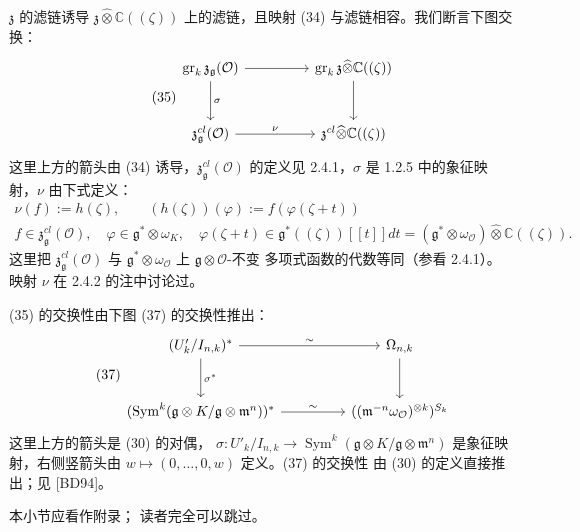 $\mathfrak{z}$ 的滤链诱导 $\mathfrak{z}\widehat{\otimes}\mathbb{C}((\zeta))$
上的滤链，且映射 (34) 与滤链相容。我们断言下图交换：
\begin{equation}\tag{35}
\begin{tikzcd}[column sep=4.6em, row sep=2.8em]
\operatorname{gr}_k\mathfrak{z}_{\mathfrak{g}}(\mathcal{O}) \arrow[r] \arrow[d, "\sigma"]
  & \operatorname{gr}_k\mathfrak{z}\widehat{\otimes}\mathbb{C}((\zeta)) \arrow[d] \\
\mathfrak{z}^{cl}_{\mathfrak{g}}(\mathcal{O}) \arrow[r, "\nu"]
  & \mathfrak{z}^{cl}\widehat{\otimes}\mathbb{C}((\zeta))
\end{tikzcd}
\end{equation}
这里上方的箭头由 (34) 诱导，$\mathfrak{z}^{cl}_{\mathfrak{g}}(\mathcal{O})$
的定义见 2.4.1，$\sigma$ 是 1.2.5 中的象征映射，$\nu$ 由下式定义：
\begin{equation}\tag{36}
\begin{gathered}
\nu(f):=h(\zeta),\qquad (h(\zeta))(\varphi):=f(\varphi(\zeta+t))\\
f\in\mathfrak{z}^{cl}_{\mathfrak{g}}(\mathcal{O}),\quad
\varphi\in\mathfrak{g}^*\otimes\omega_K,\quad
\varphi(\zeta+t)\in\mathfrak{g}^*((\zeta))[[t]]dt
=(\mathfrak{g}^*\otimes\omega_{\mathcal{O}})\widehat{\otimes}\mathbb{C}((\zeta)).
\end{gathered}
\end{equation}
这里把 $\mathfrak{z}^{cl}_{\mathfrak{g}}(\mathcal{O})$ 与
$\mathfrak{g}^*\otimes\omega_{\mathcal{O}}$ 上 $\mathfrak{g}\otimes\mathcal{O}$-不变
多项式函数的代数等同（参看 2.4.1）。映射 $\nu$ 在 2.4.2 的注中讨论过。

(35) 的交换性由下图 (37) 的交换性推出：
\begin{equation}\tag{37}
\begin{tikzcd}[column sep=4.6em, row sep=2.8em]
(U'_k/I_{n,k})^{*} \arrow[r, "\sim"] \arrow[d, "\sigma^{*}"]
  & \Omega_{n,k} \arrow[d] \\
(\operatorname{Sym}^k(\mathfrak{g}\otimes K/\mathfrak{g}\otimes\mathfrak{m}^n))^{*}
  \arrow[r, "\sim"]
  & ((\mathfrak{m}^{-n}\omega_{\mathcal{O}})^{\otimes k})^{S_k}
\end{tikzcd}
\end{equation}
这里上方的箭头是 (30) 的对偶，
$\sigma:U'_k/I_{n,k}\to
\operatorname{Sym}^k(\mathfrak{g}\otimes K/\mathfrak{g}\otimes\mathfrak{m}^n)$
是象征映射，右侧竖箭头由 $w\mapsto(0,\ldots,0,w)$ 定义。(37) 的交换性
由 (30) 的定义直接推出；见 [BD94]。

 本小节应看作附录；
读者完全可以跳过。

